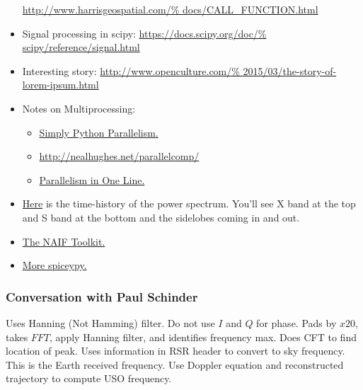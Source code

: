 \documentclass[crop=false,class=article,oneside]{standalone}
\begin{document}
\begin{itemize}[itemsep=0pt]
                      \url{http://www.harrisgeospatial.com/%
                           docs/CALL_FUNCTION.html}
                \item Signal processing in scipy:
                      \url{https://docs.scipy.org/doc/%
                           scipy/reference/signal.html}
                \item Interesting story:
                      \url{http://www.openculture.com/%
                           2015/03/the-story-of-lorem-ipsum.html}
                \item Notes on Multiprocessing:
                \begin{itemize}
                    \item \href{https://stsievert.com/blog/2014/07/30/%
                                simple-python-parallelism/}
                               {Simply Python Parallelism.}
                    \item \url{http://nealhughes.net/parallelcomp/}
                    \item \href{http://chriskiehl.com/article/%
                                parallelism-in-one-line/}
                               {Parallelism in One Line.}
                \end{itemize}
                \item \href{https://www.youtube.com/%
                            watch?time_continue=2&v=s-Xw6i61N9o}
                           {Here}
                      is the time-history of the power spectrum.
                      You'll see X band at the top and S band at
                      the bottom and the sidelobes coming in and out.
                \item \href{https://naif.jpl.nasa.gov/naif/toolkit.html}
                           {The NAIF Toolkit.}
                \item \href{http://spiceypy.readthedocs.io/en/%
                            master/exampleone.html}
                           {More spiceypy.}
            \end{itemize}
        \subsubsection{Conversation with Paul Schinder}
            Uses Hanning (Not Hamming) filter.
            Do not use $I$ and $Q$ for phase.
            Pads by $x20$, takes $FFT$, apply Hanning filter,
            and identifies frequency max.
            Does CFT to find location of peak.
            Uses information in RSR header to convert
            to sky frequency.
            This is the Earth received frequency.
            Use Doppler equation and reconstructed trajectory
            to compute USO frequency.
\end{document}
